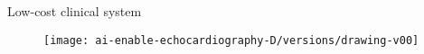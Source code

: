 {

\begin{frame}{Low-cost clinical system}
      \begin{figure}
        \centering
        \texttt{[image: ai-enable-echocardiography-D/versions/drawing-v00]}
      \end{figure}
\end{frame}
}



